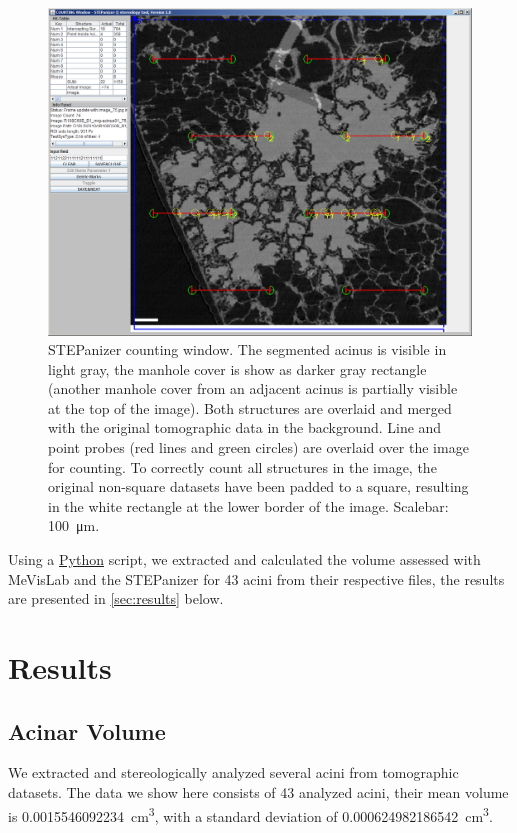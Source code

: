 \documentclass[twoside,paper=a4,abstract=true,english,DIVcalc]{scrartcl}
\newcommand{\imsize}{\linewidth}
\newcommand{\numberofacini}{43}
\newcommand{\volume}{0.0015546092234} %
\newcommand{\std}{0.000624982186542} %
\begin{document}
\renewcommand{\imsize}{\linewidth}%
\begin{figure}
	\centering
	\includegraphics[width=\imsize]{img/STEPanizer_2010_R108C60B_acinus01_Slice75}
	\caption{STEPanizer counting window. The segmented acinus is visible in light gray, the manhole cover is show as darker gray rectangle (another manhole cover from an adjacent acinus is partially visible at the top of the image). Both structures are overlaid and merged with the original tomographic data in the background. Line and point probes (red lines and green circles) are overlaid over the image for counting. To correctly count all structures in the image, the original non-square datasets have been padded to a square, resulting in the white rectangle at the lower border of the image. Scalebar: \SI{100}{\micro\meter}.}
	\label{fig:STEPanizer}
\end{figure}

Using a \href{http://python.org/}{Python} script, we extracted and calculated the volume assessed with MeVisLab and the STEPanizer for 43 acini from their respective files, the results are presented in \autoref{sec:results} below.

\section{Results}
\label{sec:results}
\subsection{Acinar Volume}
We extracted and stereologically analyzed several acini from tomographic datasets. The data we show here consists of \numberofacini\xspace analyzed acini, their mean volume is \SI{\volume}{\centi\metre\cubed}, with a standard deviation of \SI{\std}{\centi\metre\cubed}.
\end{document}
